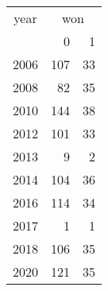 \footnotesize\begin{tabular}[t]{lrr}
\toprule
\multicolumn{1}{c}{year} & \multicolumn{2}{c}{won} \\
\cmidrule(l{3pt}r{3pt}){1-1} \cmidrule(l{3pt}r{3pt}){2-3}
  & 0 & 1\\
\midrule
2006 & 107 & 33\\
2008 & 82 & 35\\
2010 & 144 & 38\\
2012 & 101 & 33\\
2013 & 9 & 2\\
2014 & 104 & 36\\
2016 & 114 & 34\\
2017 & 1 & 1\\
2018 & 106 & 35\\
2020 & 121 & 35\\
\bottomrule
\end{tabular}
